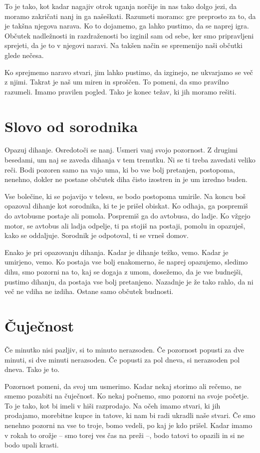 To je tako, kot kadar nagajiv otrok uganja norčije in nas tako dolgo jezi, da moramo zakričati nanj in ga našeškati. Razumeti moramo: gre preprosto za to, da je takšna njegova narava. Ko to dojamemo, ga lahko pustimo, da se naprej igra. Občutek nadležnosti in razdraženosti bo izginil sam od sebe, ker smo pripravljeni sprejeti, da je to v njegovi naravi. Na takšen način se spremenijo naši občutki glede nečesa.

Ko sprejmemo naravo stvari, jim lahko pustimo, da izginejo, ne ukvarjamo se več z njimi. Takrat je naš um miren in sproščen. To pomeni, da smo pravilno razumeli. Imamo pravilen pogled. Tako je konec težav, ki jih moramo rešiti.

\section{Slovo od sorodnika}

Opazuj dihanje. Osredotoči se nanj. Usmeri vanj svojo pozornost. Z drugimi besedami, um naj se zaveda dihanja v tem trenutku. Ni se ti treba zavedati veliko reči. Bodi pozoren samo na vajo uma, ki bo vse bolj pretanjen, postopoma, nenehno, dokler ne postane občutek diha čisto izostren in je um izredno buden.

Vse bolečine, ki se pojavijo v telesu, se bodo postopoma umirile. Na koncu boš opazoval dihanje kot sorodnika, ki te je prišel obiskat. Ko odhaja, ga pospremiš do avtobusne postaje ali pomola. Pospremiš ga do avtobusa, do ladje. Ko vžgejo motor, se avtobus ali ladja odpelje, ti pa stojiš na postaji, pomolu in opazuješ, kako se oddaljuje. Sorodnik je odpotoval, ti se vrneš domov.

Enako je pri opazovanju dihanja. Kadar je dihanje težko, vemo. Kadar je umirjeno, vemo. Ko postaja vse bolj enakomerno, še naprej opazujemo, sledimo dihu, smo pozorni na to, kaj se dogaja z umom, dosežemo, da je vse budnejši, pustimo dihanju, da postaja vse bolj pretanjeno. Nazadnje je že tako rahlo, da ni več ne vdiha ne izdiha. Ostane samo občutek budnosti.

\section{Čuječnost}

Če minutko nisi pazljiv, si to minuto nerazsoden. Če pozornost popusti za dve minuti, si dve minuti nerazsoden. Če popusti za pol dneva, si nerazsoden pol dneva. Tako je to.

Pozornost pomeni, da svoj um usmerimo. Kadar nekaj storimo ali rečemo, ne smemo pozabiti na čuječnost. Ko nekaj počnemo, smo pozorni na svoje početje. To je tako, kot bi imeli v hiši razprodajo. Na očeh imamo stvari, ki jih prodajamo, morebitne kupce in tatove, ki nam bi radi ukradli naše stvari. Če smo nenehno pozorni na vse to troje, bomo vedeli, po kaj je kdo prišel. Kadar imamo v rokah to orožje – smo torej ves čas na preži –, bodo tatovi to opazili in si ne bodo upali krasti.

